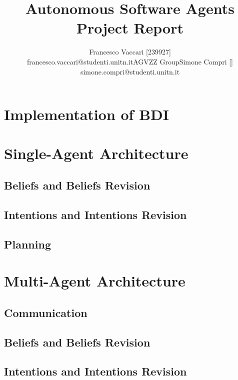 \documentclass[a4paper, 11pt]{article}
\title{\Huge{Autonomous Software Agents} \\ \Large{Project Report} }
\author{
\begin{tabular}{ccc}
\parbox{7cm}{\centering Francesco Vaccari [239927] \\ \small{\centering francesco.vaccari@studenti.unitn.it}} & 
\parbox{1cm}{\centering \footnotesize{AGVZZ Group}} & 
\parbox{7cm}{\centering Simone Compri [] \\ \small{\centering simone.compri@studenti.unitn.it}}
\end{tabular}
}
\date{}
\begin{document}
\maketitle
\tableofcontents




\section{Implementation of BDI}


\pagebreak



\section{Single-Agent Architecture}


\subsection{Beliefs and Beliefs Revision}


\subsection{Intentions and Intentions Revision}


\subsection{Planning}





\pagebreak

\section{Multi-Agent Architecture}


\subsection{Communication}


\subsection{Beliefs and Beliefs Revision}


\subsection{Intentions and Intentions Revision}
\end{document}
